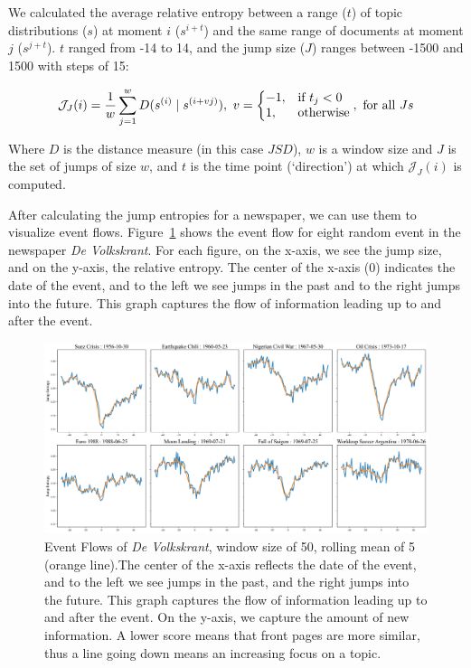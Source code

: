 \documentclass[]{ceurart}
\begin{document}
We calculated the average relative entropy between a range ($t$) of topic distributions ($s$) at moment $i$ ($s^{i+t}$) and the same range of documents at moment $j$ ($s^{j+t}$). $t$ ranged from -14 to 14, and the jump size ($J$) ranges between -1500 and 1500 with steps of 15:

\begin{equation}
\mathcal{J}_{J}(i) = \frac{1}{w} \sum_{j=1}^{w} D (s^{(i)} \mid s^{(i + vj)}), ~v=\left\{
  \begin{array}{@{}ll@{}}
    -1, & \text{if}\ t_j < 0 \\
    1, & \text{otherwise}
  \end{array}\right.
  ,~\text{for all}~Js
  \label{eq:jump_entropy}
\end{equation}

\noindent Where $D$ is the distance measure (in this case $JSD$), $w$ is a window size and $J$ is the set of jumps of size $w$, and $t$ is the time point (`direction') at which $\mathcal{J}_{J}(i)$ is computed. 

After calculating the jump entropies for a newspaper, we can use them to visualize event flows. Figure~\ref{fig:event_flows_vk} shows the event flow for eight random event in the newspaper \textit{De Volkskrant}. For each figure, on the x-axis, we see the jump size, and on the y-axis, the relative entropy. The center of the x-axis (0) indicates the date of the event, and to the left we see jumps in the past and to the right jumps into the future. This graph captures the flow of information leading up to and after the event.

\begin{figure}
    \centering
    \includegraphics[width=\linewidth]{figures/img2.png}
    \caption{Event Flows of \textit{De Volkskrant}, window size of 50, rolling mean of 5 (orange line).The center of the x-axis reflects the date of the event, and to the left we see jumps in the past, and the right jumps into the future. This graph captures the flow of information leading up to and after the event. On the y-axis, we capture the amount of new information. A lower score means that front pages are more similar, thus a line going down means an increasing focus on a topic.}
    \label{fig:event_flows_vk}
\end{figure}
\end{document}
